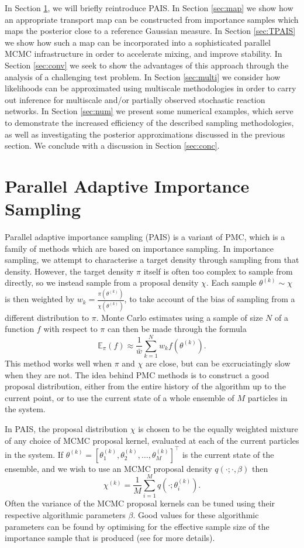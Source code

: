\documentclass[final]{siamltex}
\begin{document}
In Section \ref{sec:PAIS}, we will briefly reintroduce PAIS. In Section \ref{sec:map} we show how an appropriate transport map can
be constructed from importance samples which maps the posterior close
to a reference Gaussian measure. In Section \ref{sec:TPAIS} we show
how such a map can be incorporated into a sophisticated parallel MCMC
infrastructure in order to accelerate mixing, and improve stability. In Section
\ref{sec:conv} we seek to show the advantages of this approach through
the analysis of a challenging test problem. In Section
\ref{sec:multi} we consider how likelihoods can be approximated using
 multiscale methodologies in order to carry out inference for
multiscale and/or partially observed stochastic reaction networks. In
Section \ref{sec:num} we present some numerical examples, which serve
to demonstrate the increased efficiency of the described sampling
methodologies, as well as investigating the posterior approximations
discussed in the previous section. We conclude with a discussion in
Section \ref{sec:conc}.

\section{Parallel Adaptive Importance Sampling}\label{sec:PAIS}
Parallel adaptive importance sampling (PAIS)\cite{cotter2015parallel} is a variant of PMC\cite{cappe2012population}, which is a family of methods which are based
on importance sampling. In importance sampling, we attempt to
characterise a target density through sampling from that
density. However, the target density $\pi$ itself is often too complex to sample
from directly, so we instead sample from a
proposal density $\chi$. Each sample $\theta^{(k)} \sim \chi$ is then weighted by
$w_k = \frac{\pi(\theta^{(k)})}{\chi(\theta^{(k)})}$, to take account of the bias of
sampling from a different distribution to $\pi$. Monte Carlo estimates
using a sample of size $N$
of a function $f$ with respect to $\pi$ can then be made through the
formula
\[\mathbb{E}_\pi(f) \approx \frac{1}{\bar{w}} \sum_{k=1}^N
  w_kf(\theta^(k)).\]
This method works well when $\pi$ and $\chi$ are close, but can be
excruciatingly slow when they are not. The idea behind PMC methods is
to construct a good proposal distribution, either from the entire
history of the algorithm up to the current point, or to use the
current state of a whole ensemble of $M$ particles in the system.

In PAIS, the proposal distribution $\chi$ is chosen to be the equally
weighted mixture of any choice of MCMC proposal kernel, evaluated at
each of the current particles in the system. If $\theta^{(k)} = [\theta_1^{(k)},
\theta_2^{(k)}, \ldots, \theta_M^{(k)}]^\top$ is the current state of the
ensemble, and we wish to use an MCMC proposal density $q(\cdot ;
\cdot, \beta)$ then 
\[\chi^{(k)} = \frac{1}{M} \sum_{i=1}^M q(\cdot ; \theta_i^{(k)}).\]
Often the variance of the MCMC proposal kernels can be tuned using
their respective algorithmic parameters $\beta$. Good values for these
algorithmic parameters can be
found by optimising for the effective sample size of the importance
sample that is produced (see \cite{cotter2015parallel, russ2017parallel} for more details).
\end{document}
